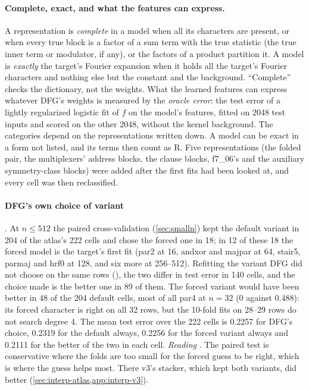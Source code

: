 \paragraph{Complete, exact, and what the features can express.} A representation is \emph{complete} in a model when all its characters are present, or when every true block is a factor of a sum term with the true statistic (the true inner term or modulator, if any), or the factors of a product partition it. A model is \emph{exactly} the target's Fourier expansion when it holds all the target's Fourier characters and nothing else but the constant and the background. ``Complete'' checks the dictionary, not the weights. What the learned features can express whatever DFG's weights is measured by the \emph{oracle error}: the test error of a lightly regularized logistic fit of $f$ on the model's features, fitted on 2048 test inputs and scored on the other 2048, without the kernel background. The categories depend on the representations written down. A model can be exact in a form not listed, and its terms then count as R. Five representations (the folded pair, the multiplexers' address blocks, the clause blocks, f7\_06's and the auxiliary symmetry-class blocks) were added after the first fits had been looked at, and every cell was then reclassified.

\paragraph{DFG's own choice of variant} . At $n\le512$ the paired cross-validation (\cref{sec:smalln}) kept the default variant in 204 of the atlas's 222 cells and chose the forced one in 18; in 12 of these 18 the forced model is the target's first fit (par2 at 16, andxor and majpar at 64, stair5, parmaj and hrf0 at 128, and six more at 256--512). Refitting the variant DFG did not choose on the same rows (), the two differ in test error in 140 cells, and the choice made is the better one in 89 of them. The forced variant would have been better in 48 of the 204 default cells, most of all par4 at $n=32$ (0 against 0.488): its forced character is right on all 32 rows, but the 10-fold fits on 28--29 rows do not search degree 4. The mean test error over the 222 cells is 0.2257 for DFG's choice, 0.2319 for the default always, 0.2256 for the forced variant always and 0.2111 for the better of the two in each cell. \emph{Reading} . The paired test is conservative where the folds are too small for the forced guess to be right, which is where the guess helps most. There v3's stacker, which kept both variants, did better (\cref{sec:interp-atlas,app:interp-v3}).

